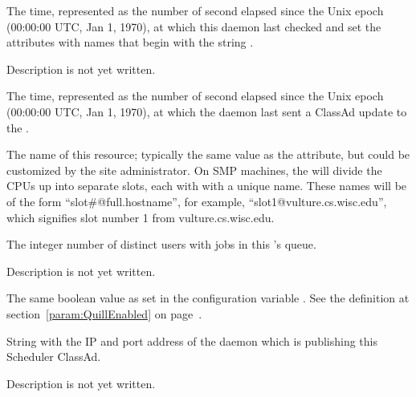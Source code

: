 \begin{description}
\item[\AdAttr{MonitorSelfTime}:] The  time, represented as the number of
  second elapsed since the Unix epoch (00:00:00 UTC, Jan 1, 1970),
  at which this daemon last checked and set the attributes with names that
  begin with the string .
  
\item[\AdAttr{MyAddress}:] Description is not yet written.

\item[\AdAttr{MyCurrentTime}:]  The time, represented as the number of 
  second elapsed since the Unix epoch (00:00:00 UTC, Jan 1, 1970),
  at which the  daemon last sent a ClassAd update to the
  .

\item[\AdAttr{Name}:] The name of this resource; typically the same value as
  the  attribute, but could be customized by the site
  administrator.
  On SMP machines, the  will divide the CPUs up into separate
  slots, each with with a unique name.
  These names will be of the form ``slot\#@full.hostname'', for example,
  ``slot1@vulture.cs.wisc.edu'', which signifies slot number 1 from
  vulture.cs.wisc.edu.

\item[\AdAttr{NumUsers}:] The integer number of distinct users with jobs in
  this 's queue.

\item[\AdAttr{PublicNetworkIpAddr}:] Description is not yet written.

\item[\AdAttr{QuillEnabled}:] The same boolean value as set in the
  configuration variable .
  See the definition at section~\ref{param:QuillEnabled} on
  page~\pageref{param:QuillEnabled}.

\item[\AdAttr{ScheddIpAddr}:] String with the IP and port address of the
 daemon which is publishing this Scheduler ClassAd.

\item[\AdAttr{ServerTime}:] Description is not yet written.


\end{description}
